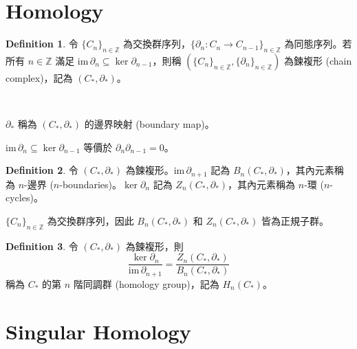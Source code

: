 \documentclass[12pt]{article}
\theoremstyle{definition}
\newtheorem{definition}{Definition}[section]
\newcommand\<{\langle}
\renewcommand\>{\rangle}
\newcommand\im{\mathrm{im}\hspace{2pt}}
\begin{document}
\begin{CJK}{UTF8}{bsmi}
\section{Homology}

\begin{definition}
    令 $\{C_n\}_{n\in\mathbb{Z}}$ 為交換群序列，$\{\partial_n:C_n\to C_{n-1}\}_{n\in\mathbb{Z}}$ 為同態序列。若所有 $n\in\mathbb{Z}$ 滿足 $\im\partial_n\subseteq\ker\partial_{n-1}$，則稱 $(\{C_n\}_{n\in\mathbb{Z}}, \{\partial_n\}_{n\in\mathbb{Z}})$ 為鍊複形 (chain complex)，記為 $(C_*, \partial_*)$。
    \begin{center}
     \\
    \end{center}
\end{definition}

$\partial_*$ 稱為 $(C_*, \partial_*)$ 的邊界映射 (boundary map)。

$\im\partial_n\subseteq\ker\partial_{n-1}$ 等價於 $\partial_n\partial_{n-1}=0$。

\begin{definition}
    令 $(C_*, \partial_*)$ 為鍊複形。$\im\partial_{n+1}$ 記為 $B_n(C_*, \partial_*)$，其內元素稱為 $n$-邊界 ($n$-boundaries)。$\ker\partial_n$ 記為 $Z_n(C_*, \partial_*)$，其內元素稱為 $n$-環 ($n$-cycles)。
\end{definition}

$\{C_n\}_{n\in\mathbb{Z}}$ 為交換群序列，因此 $B_n(C_*, \partial_*)$ 和 $Z_n(C_*, \partial_*)$ 皆為正規子群。

\begin{definition}
    令 $(C_*, \partial_*)$ 為鍊複形，則
    \[
        \frac{\ker\partial_n}{\im\partial_{n+1}}
        =
        \frac{Z_n(C_*, \partial_*)}{B_n(C_*, \partial_*)}
    \]
    稱為 $C_*$ 的第 $n$ 階同調群 (homology group)，記為 $H_n(C_*)$。
\end{definition}

\section{Singular Homology}


\end{CJK}
\end{document}
